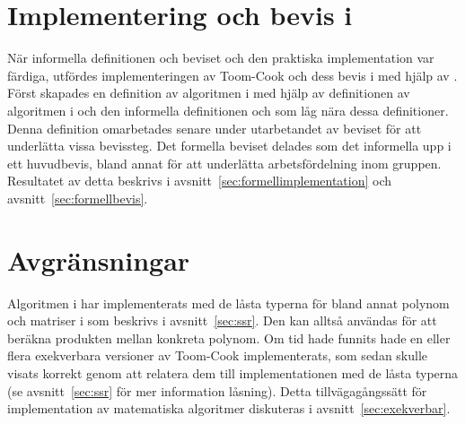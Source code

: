 \section{Implementering och bevis i \coq{}}
När informella definitionen och beviset och den praktiska implementation var
färdiga, utfördes implementeringen av Toom-Cook och dess bevis i \coq{} med
hjälp av \ssr{}. Först skapades en definition av algoritmen i \coq{} med hjälp
av definitionen av algoritmen i \haskell{} och den informella definitionen och
som låg nära dessa definitioner. Denna definition omarbetades senare under
utarbetandet av beviset för att underlätta vissa bevissteg. Det formella
beviset delades som det informella upp i ett huvudbevis, bland annat för att
underlätta arbetsfördelning inom gruppen. Resultatet av detta beskrivs i
avsnitt~\ref{sec:formellimplementation} och avsnitt~\ref{sec:formellbevis}.

\section{Avgränsningar}
Algoritmen i \coq{} har implementerats med de låsta typerna för bland annat
polynom och matriser i \ssr{} som beskrivs i avsnitt~\ref{sec:ssr}. Den kan
alltså användas för att beräkna produkten mellan konkreta polynom. Om tid hade
funnits hade en eller flera exekverbara versioner av Toom-Cook implementerats,
som sedan skulle visats korrekt genom att relatera dem till implementationen
med de låsta typerna (se avsnitt~\ref{sec:ssr} för mer information låsning).
Detta tillvägagångssätt för implementation av matematiska algoritmer diskuteras
i avsnitt~\ref{sec:exekverbar}.
